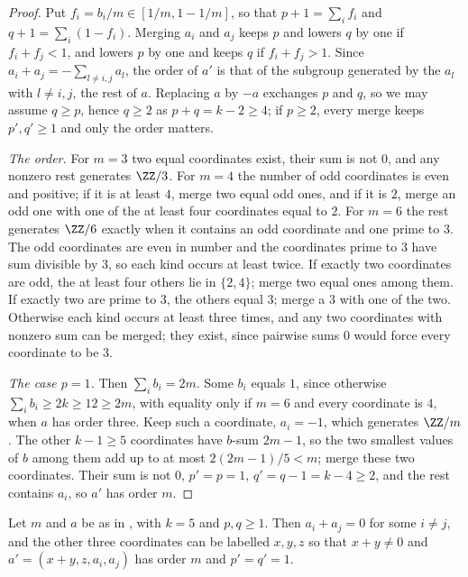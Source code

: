 \begin{proof}
Put $f_{i}=b_{i}/m\in[1/m,1-1/m]$, so that $p+1=\sum_{i}f_{i}$ and
$q+1=\sum_{i}(1-f_{i})$. Merging $a_{i}$ and $a_{j}$ keeps $p$ and lowers $q$
by one if $f_{i}+f_{j}<1$, and lowers $p$ by one and keeps $q$ if
$f_{i}+f_{j}>1$. Since $a_{i}+a_{j}=-\sum_{l\ne i,j}a_{l}$, the order of $a'$ is
that of the subgroup generated by the $a_{l}$ with $l\ne i,j$, the rest of
$a$. Replacing $a$ by $-a$ exchanges $p$ and $q$, so we may assume $q\ge p$,
hence $q\ge2$ as $p+q=k-2\ge4$; if $p\ge2$, every merge keeps $p',q'\ge1$
and only the order matters.

\emph{The order.} For $m=3$ two equal coordinates exist, their sum is not
$0$, and any nonzero rest generates $\ZZ/3$. For $m=4$ the number of odd
coordinates is even and positive; if it is at least $4$, merge two equal odd
ones, and if it is $2$, merge an odd one with one of the at least four
coordinates equal to $2$. For $m=6$ the rest generates $\ZZ/6$ exactly when
it contains an odd coordinate and one prime to $3$. The odd coordinates
are even in number and the coordinates prime to $3$ have sum divisible by
$3$, so each kind occurs at least twice. If exactly two coordinates are
odd, the at least four others lie in $\{2,4\}$; merge two equal ones among
them. If exactly two are prime to $3$, the others equal $3$; merge a $3$
with one of the two. Otherwise each kind occurs at least three times, and
any two coordinates with nonzero sum can be merged; they exist, since
pairwise sums $0$ would force every coordinate to be $3$.

\emph{The case $p=1$.} Then $\sum_{i}b_{i}=2m$. Some $b_{i}$ equals $1$,
since otherwise $\sum_{i}b_{i}\ge2k\ge12\ge2m$, with equality only if $m=6$
and every coordinate is $4$, when $a$ has order three. Keep such a coordinate,
$a_{i}=-1$, which generates $\ZZ/m$. The other $k-1\ge5$ coordinates have
$b$-sum $2m-1$, so the two smallest values of $b$ among them add up to at most
$2(2m-1)/5<m$; merge these two coordinates. Their sum is not $0$, $p'=p=1$,
$q'=q-1=k-4\ge2$, and the rest contains $a_{i}$, so $a'$ has order $m$.
\end{proof}

\begin{lemma}\label{lem:mergefive}
Let $m$ and $a$ be as in , with $k=5$ and $p,q\ge1$. Then
$a_{i}+a_{j}=0$ for some $i\ne j$, and the other three coordinates can be
labelled $x,y,z$ so that $x+y\ne0$ and $a'=(x+y,z,a_{i},a_{j})$ has order $m$
and $p'=q'=1$.
\end{lemma}

